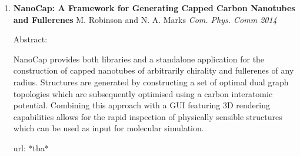 \begin{enumerate}
\item \textbf{NanoCap: A Framework for Generating Capped Carbon Nanotubes and Fullerenes}
\newline M. Robinson and N. A. Marks \textit{Com. Phys. Comm 2014}

Abstract:

NanoCap provides both libraries and a standalone application for the construction of capped nanotubes of arbitrarily chirality and fullerenes of any radius. 
Structures are generated by constructing a set of optimal dual graph topologies which are subsequently optimised using a carbon interatomic potential. 
Combining this approach with a GUI featuring 3D rendering capabilities allows for the rapid inspection of physically sensible structures which can be used as input for molecular simulation.

url: *tba*

\end{enumerate}

%

